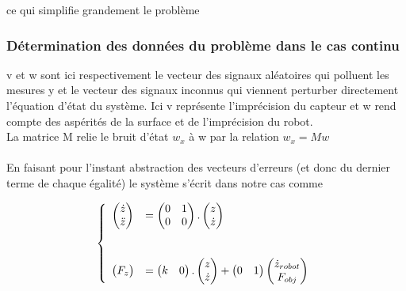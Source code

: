 \documentclass[12pt,twoside,a4paper]{article}
\begin{document}
ce qui simplifie grandement le problème

\subsubsection{Détermination des données du problème dans le cas continu}


v et w sont ici respectivement le vecteur des signaux aléatoires qui polluent les mesures y et le vecteur  des signaux inconnus qui viennent perturber directement l'équation d'état du système. Ici  v représente l'imprécision du capteur et w rend compte des aspérités de la surface et de l'imprécision du robot. \\
La matrice M relie le bruit d'état $w_x$ à w par la relation $w_x = Mw$ \\
\vspace {1cm} \\
En faisant pour l'instant abstraction des vecteurs d'erreurs (et donc du dernier terme de chaque égalité) le système s'écrit dans notre cas comme

$$
\left\{
\begin{array}{ll}
        \begin{pmatrix} \dot{z} \\ \ddot{z} \end{pmatrix}
        &= \begin{pmatrix}
        0 & 1 \\
        0 & 0 \\
        \end{pmatrix}.
        \begin{pmatrix} z  \\ \dot{z} \end{pmatrix} \\
        \vspace{0.5cm} \\
        \begin{pmatrix} F_z  \end{pmatrix}
         &= \begin{pmatrix} k & 0 \end{pmatrix}.
	 	\begin{pmatrix} z \\  \dot{z} \end{pmatrix}
	+ \begin{pmatrix} 0 & 1 \end{pmatrix}
	 \begin{pmatrix} \dot{z}_{robot} \\ F_{obj}\end{pmatrix}\\
\end{array}
\right.
$$
\end{document}
